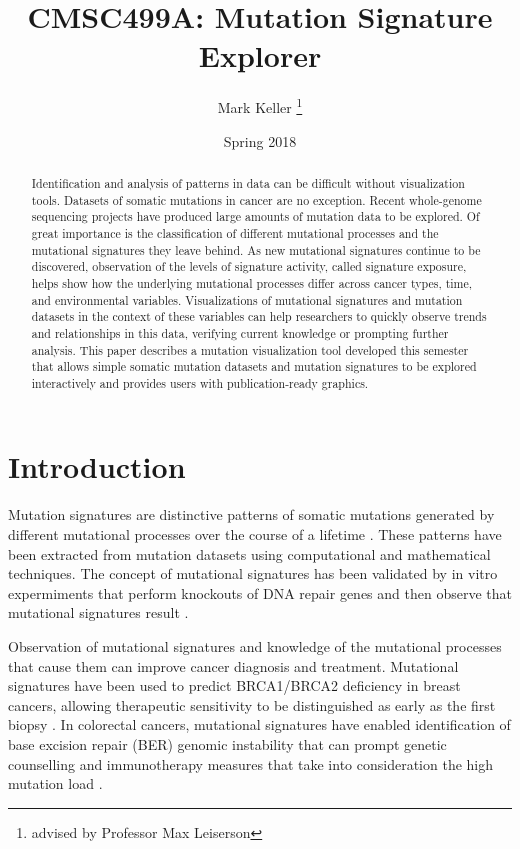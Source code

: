 \documentclass[12pt, letterpaper]{article}
\title{CMSC499A: Mutation Signature Explorer}
\author{Mark Keller \thanks{advised by Professor Max Leiserson}}
\date{Spring 2018}
\begin{document}
\maketitle

\begin{abstract}
Identification and analysis of patterns in data can be difficult without visualization tools. 
Datasets of somatic mutations in cancer are no exception.
Recent whole-genome sequencing projects have produced large amounts of mutation data to be explored.
Of great importance is the classification of different mutational processes and the mutational signatures\cite{alexandrov2013signatures} they leave behind.
As new mutational signatures continue to be discovered, observation of the levels of signature activity, called signature exposure, helps show how the underlying mutational processes differ across cancer types, time, and environmental variables.
Visualizations of mutational signatures and mutation datasets in the context of these variables can help researchers to quickly observe trends and relationships in this data, verifying current knowledge or prompting further analysis.
This paper describes a mutation visualization tool developed this semester that allows simple somatic mutation datasets and mutation signatures to be explored interactively and provides users with publication-ready graphics.
\end{abstract}

\section{Introduction}
Mutation signatures are distinctive patterns of somatic mutations generated by different mutational processes over the course of a lifetime \cite{alexandrov2013signatures}. 
These patterns have been extracted from mutation datasets using computational and mathematical techniques. 
The concept of mutational signatures has been validated by in vitro expermiments that perform knockouts of DNA repair genes and then observe that mutational signatures result \cite{zou2018validating}.

Observation of mutational signatures and knowledge of the mutational processes that cause them can improve cancer diagnosis and treatment. 
Mutational signatures have been used to predict BRCA1/BRCA2 deficiency in breast cancers, allowing therapeutic sensitivity to be distinguished as early as the first biopsy \cite{davies2017hrdetect}.
In colorectal cancers, mutational signatures have enabled identification of base excision repair (BER) genomic instability that can prompt genetic counselling and immunotherapy measures that take into consideration the high mutation load \cite{pilati2017mutational}.
\end{document}
